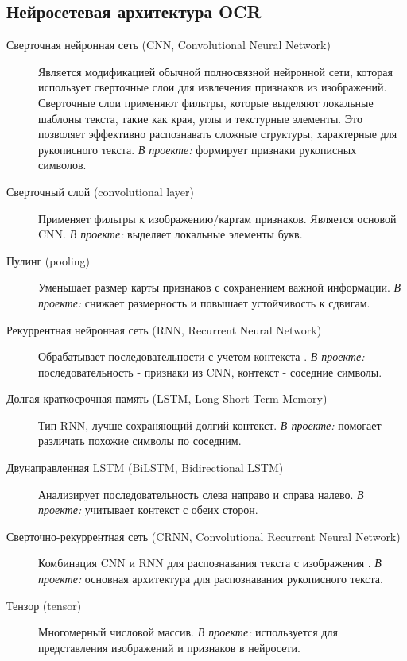 \documentclass[12pt,a4paper]{article}
\begin{document}
\subsection{Нейросетевая архитектура OCR}

\begin{description}
    \item[Сверточная нейронная сеть (CNN, Convolutional Neural Network)] Является модификацией обычной полносвязной нейронной сети, которая использует
    сверточные слои для извлечения признаков из изображений. Сверточные слои применяют
    фильтры, которые выделяют локальные шаблоны текста, такие как края, углы и текстурные элементы. Это позволяет эффективно распознавать сложные структуры, характерные для рукописного текста.
    \textit{В проекте:} формирует признаки рукописных символов.

    \item[Сверточный слой (convolutional layer)]
    Применяет фильтры к изображению/картам признаков. Является основой CNN.
    \textit{В проекте:} выделяет локальные элементы букв.

    \item[Пулинг (pooling)]
    Уменьшает размер карты признаков с сохранением важной информации.
    \textit{В проекте:} снижает размерность и повышает устойчивость к сдвигам.

    \item[Рекуррентная нейронная сеть (RNN, Recurrent Neural Network)]
    Обрабатывает последовательности с учетом контекста \cite{mdrnn2008}.
    \textit{В проекте:} последовательность - признаки из CNN, контекст - соседние символы.

    \item[Долгая краткосрочная память (LSTM, Long Short-Term Memory)]
    Тип RNN, лучше сохраняющий долгий контекст.
    \textit{В проекте:} помогает различать похожие символы по соседним.

    \item[Двунаправленная LSTM (BiLSTM, Bidirectional LSTM)]
    Анализирует последовательность слева направо и справа налево.
    \textit{В проекте:} учитывает контекст с обеих сторон.

    \item[Сверточно-рекуррентная сеть (CRNN, Convolutional Recurrent Neural Network)]
    Комбинация CNN и RNN для распознавания текста с изображения \cite{survey2023}.
    \textit{В проекте:} основная архитектура для распознавания рукописного текста.

    \item[Тензор (tensor)]
    Многомерный числовой массив.
    \textit{В проекте:} используется для представления изображений и признаков в нейросети.


\end{description}
\end{document}
